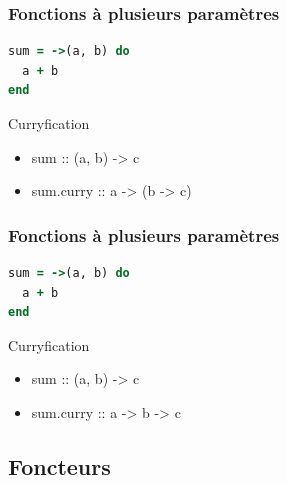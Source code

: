 \documentclass{beamer}
\begin{document}
\begin{frame}[fragile]
\frametitle{Fonctions à plusieurs paramètres}
\begin{block}{}
\begin{lstlisting}[language=ruby,basicstyle=\ttfamily,keywordstyle=\color{red}]
sum = ->(a, b) do
  a + b
end
\end{lstlisting}
\end{block}
\begin{block}{Curryfication}
\begin{itemize}
\item sum :: (a, b) -> c
\item sum.curry :: a -> (b -> c)
\end{itemize}
\end{block}
\end{frame}

\begin{frame}[fragile]
\frametitle{Fonctions à plusieurs paramètres}
\begin{block}{}
\begin{lstlisting}[language=ruby,basicstyle=\ttfamily,keywordstyle=\color{red}]
sum = ->(a, b) do
  a + b
end
\end{lstlisting}
\end{block}
\begin{block}{Curryfication}
\begin{itemize}
\item sum :: (a, b) -> c
\item sum.curry :: a -> b -> c
\end{itemize}
\end{block}
\end{frame}

\subsection{Foncteurs}
\end{document}
